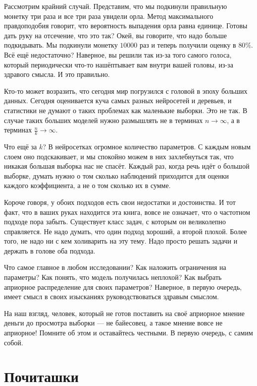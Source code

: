 \documentclass[12pt, a4paper, oneside]{extreport}
\theoremstyle{plain}              %
\theoremstyle{definition}         %
\begin{document}
Рассмотрим крайний случай. Представим, что мы подкинули правильную монетку три раза и все три раза увидели орла. Метод максимального правдоподобия говорит, что вероятность выпадения орла равна единице. Готовы дать руку на отсечение, что это так? Окей, вы говорите, что надо больше подкидывать. Мы подкинули монетку $10 000$ раз и теперь получили оценку в $80\%$. Всё ещё недостаточно? Наверное, вы решили так из-за того самого голоса, который периодически что-то нашёптывает вам внутри вашей головы, из-за здравого смысла. И это правильно.

Кто-то может возразить, что сегодня мир погрузился с головой в эпоху больших данных. Сегодня оценивается куча самых разных нейросетей и деревьев, и статистики не думают о таких проблемах как маленькие выборки. Это не так. В случае таких больших моделей нужно размышлять не в терминах $n \to \infty$, а в терминах $\frac{n}{k} \to \infty$. 

Что ещё за $k$? В нейросетках огромное количество параметров. С каждым новым слоем оно подскакивает, и мы спокойно можем в них захлебнуться так, что никакая большая выборка нас не спасёт. Каждый раз, когда речь идёт о большой выборке, думать нужно о том сколько наблюдений приходится для оценки каждого коэффициента, а не о том сколько их в сумме.

Короче говоря, у обоих подходов есть свои недостатки и достоинства. И тот факт, что в ваших руках находится эта книга, вовсе не означает, что о частотном подходе пора забыть. Существует класс задач, с которым он великолепно справляется. Не надо думать, что один подход хороший, а второй плохой. Более того, не надо ни с кем холиварить на эту тему. Надо просто решать задачи и держать в голове оба подхода.

Что самое главное в любом исследовании? Как наложить ограничения на параметры? Как понять, что модель получилась неплохой? Как выбрать априорное распределение для своих параметров? Наверное, в первую очередь, имеет смысл в своих изысканиях руководствоваться здравым смыслом.

На наш взгляд, человек, который не готов поставить на своё априорное мнение деньги до просмотра выборки --- не байесовец, а такое мнение вовсе не априорное! Помните об этом и оставайтесь честными. В первую очередь, с самим собой.


\section{Почиташки}
\end{document}
